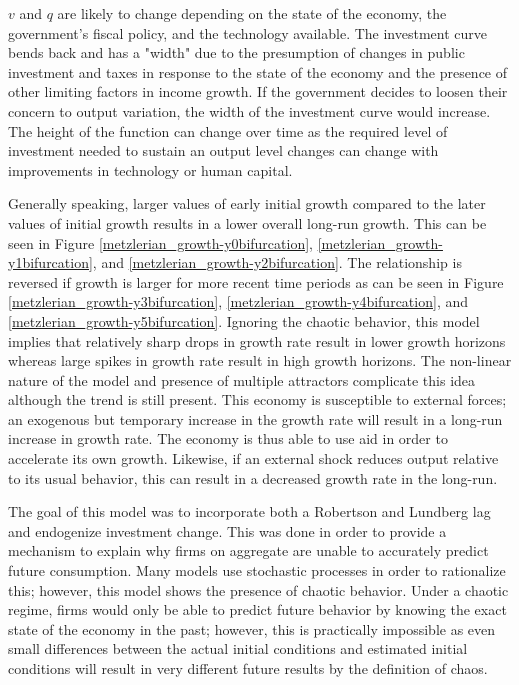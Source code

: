 $v$ and $q$ are likely to change depending on the state of the economy, the government's fiscal policy, and the technology available. The investment curve bends back and has a "width" due to the presumption of changes in public investment and taxes in response to the state of the economy and the presence of other limiting factors in income growth. If the government decides to loosen their concern to output variation, the width of the investment curve would increase. The height of the function can change over time as the required level of investment needed to sustain an output level changes can change with improvements in technology or human capital. 

Generally speaking, larger values of early initial growth compared to the later values of initial growth results in a lower overall long-run growth. This can be seen in Figure \ref{metzlerian_growth-y0bifurcation}, \ref{metzlerian_growth-y1bifurcation}, and \ref{metzlerian_growth-y2bifurcation}. The relationship is reversed if growth is larger for more recent time periods as can be seen in Figure \ref{metzlerian_growth-y3bifurcation}, \ref{metzlerian_growth-y4bifurcation}, and \ref{metzlerian_growth-y5bifurcation}. Ignoring the chaotic behavior, this model implies that relatively sharp drops in growth rate result in lower growth horizons whereas large spikes in growth rate result in high growth horizons. The non-linear nature of the model and presence of multiple attractors complicate this idea although the trend is still present. This economy is susceptible to external forces; an exogenous but temporary increase in the growth rate will result in a long-run increase in growth rate. The economy is thus able to use aid in order to accelerate its own growth. Likewise, if an external shock reduces output relative to its usual behavior, this can result in a decreased growth rate in the long-run. 

The goal of this model was to incorporate both a Robertson and Lundberg lag and endogenize investment change. This was done in order to provide a mechanism to explain why firms on aggregate are unable to accurately predict future consumption. Many models use stochastic processes in order to rationalize this; however, this model shows the presence of chaotic behavior. Under a chaotic regime, firms would only be able to predict future behavior by knowing the exact state of the economy in the past; however, this is practically impossible as even small differences between the actual initial conditions and estimated initial conditions will result in very different future results by the definition of chaos. 

